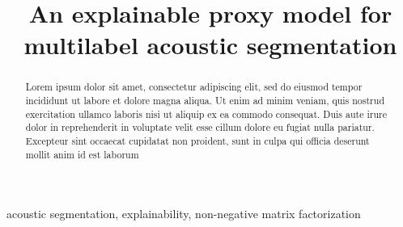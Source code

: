 \documentclass{article}
\title{An explainable proxy model for multilabel acoustic segmentation}
\begin{document}
\ninept

\maketitle
%
\begin{abstract}
Lorem ipsum dolor sit amet, consectetur adipiscing elit, sed do eiusmod tempor incididunt ut labore et dolore magna aliqua. Ut enim ad minim veniam, quis nostrud exercitation ullamco laboris nisi ut aliquip ex ea commodo consequat. Duis aute irure dolor in reprehenderit in voluptate velit esse cillum dolore eu fugiat nulla pariatur. Excepteur sint occaecat cupidatat non proident, sunt in culpa qui officia deserunt mollit anim id est laborum
\end{abstract}
%
\begin{keywords}
acoustic segmentation, explainability, non-negative matrix factorization
\end{keywords}
%







\newpage


%
\end{document}
